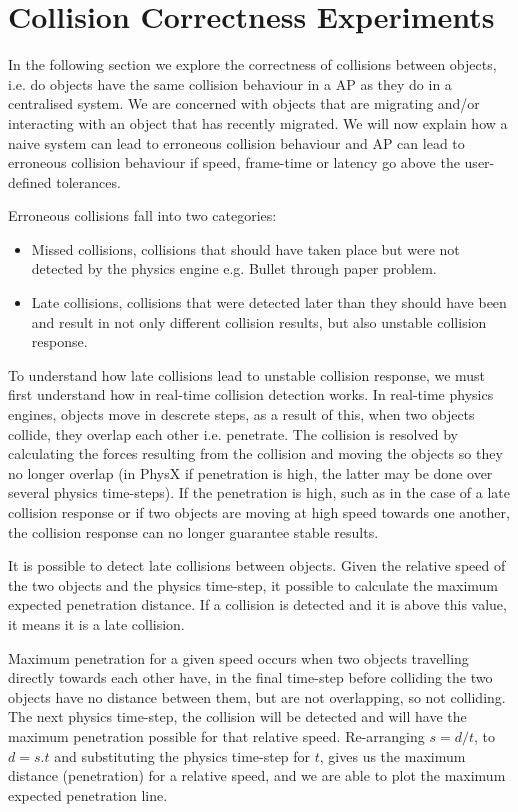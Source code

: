 \section{Collision Correctness Experiments}
In the following section we explore the correctness of collisions between objects, i.e. do objects have the same collision behaviour in a AP as they do in a centralised system. We are concerned with objects that are migrating and/or interacting with an object that has recently migrated.
We will now explain how a naive system can lead to erroneous collision behaviour and AP can lead to erroneous collision behaviour if speed, frame-time or latency go above the user-defined tolerances.

Erroneous collisions fall into two categories:
\begin{itemize}
	\item Missed collisions, collisions that should have taken place but were not detected by the physics engine e.g. Bullet through paper problem.
	\item Late collisions, collisions that were detected later than they should have been and result in not only different collision results, but also unstable collision response.
\end{itemize} 


To understand how late collisions lead to unstable collision response, we must first understand how in real-time collision detection works. In real-time physics engines, objects move in descrete steps, as a result of this, when two objects collide, they overlap each other i.e. penetrate. The collision is resolved by calculating the forces resulting from the collision and moving the objects so they no longer overlap (in PhysX if penetration is high, the latter may be done over several physics time-steps). If the penetration is high, such as in the case of a late collision response or if two objects are moving at high speed towards one another, the collision response can no longer guarantee stable results.

It is possible to detect late collisions between objects. Given the relative speed of the two objects and the physics time-step, it possible to calculate the maximum expected penetration distance. If a collision is detected and it is above this value, it means it is a late collision.

Maximum penetration for a given speed occurs when two objects travelling directly towards each other have, in the final time-step before colliding the two objects have no distance between them, but are not overlapping, so not colliding. The next physics time-step, the collision will be detected and will have the maximum penetration possible for that relative speed. Re-arranging $s=d/t$, to $d=s.t$ and substituting the physics time-step for $t$, gives us the maximum distance (penetration) for a relative speed, and we are able to plot the maximum expected penetration line.

